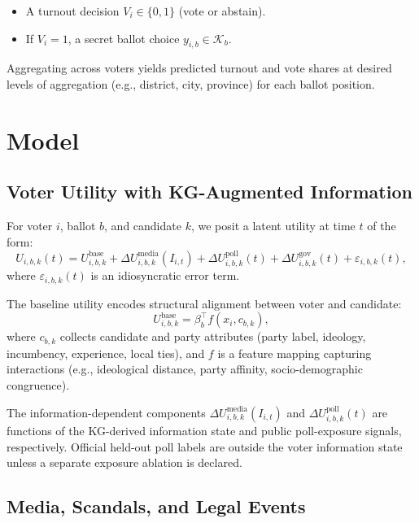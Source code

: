 \documentclass[11pt]{article}
\begin{document}
\begin{itemize}
  \item A turnout decision $V_i \in \{0,1\}$ (vote or abstain).
  \item If $V_i = 1$, a secret ballot choice $y_{i,b} \in \mathcal{K}_b$.
\end{itemize}

Aggregating across voters yields predicted turnout and vote shares at desired levels of aggregation (e.g., district, city, province) for each ballot position.

\section{Model}

\subsection{Voter Utility with KG-Augmented Information}

For voter $i$, ballot $b$, and candidate $k$, we posit a latent utility at time $t$ of the form:
\begin{equation}
U_{i,b,k}(t) = U^{\text{base}}_{i,b,k} + \Delta U^{\text{media}}_{i,b,k}(I_{i,t}) + \Delta U^{\text{poll}}_{i,b,k}(t) + \Delta U^{\text{gov}}_{i,b,k}(t) + \varepsilon_{i,b,k}(t),
\end{equation}
where $\varepsilon_{i,b,k}(t)$ is an idiosyncratic error term.

The baseline utility encodes structural alignment between voter and candidate:
\begin{equation}
U^{\text{base}}_{i,b,k} = \beta_b^\top f(x_i, c_{b,k}),
\end{equation}
where $c_{b,k}$ collects candidate and party attributes (party label, ideology, incumbency, experience, local ties), and $f$ is a feature mapping capturing interactions (e.g., ideological distance, party affinity, socio-demographic congruence).

The information-dependent components $\Delta U^{\text{media}}_{i,b,k}(I_{i,t})$ and $\Delta U^{\text{poll}}_{i,b,k}(t)$ are functions of the KG-derived information state and public poll-exposure signals, respectively. Official held-out poll labels are outside the voter information state unless a separate exposure ablation is declared.

\subsection{Media, Scandals, and Legal Events}
\end{document}

